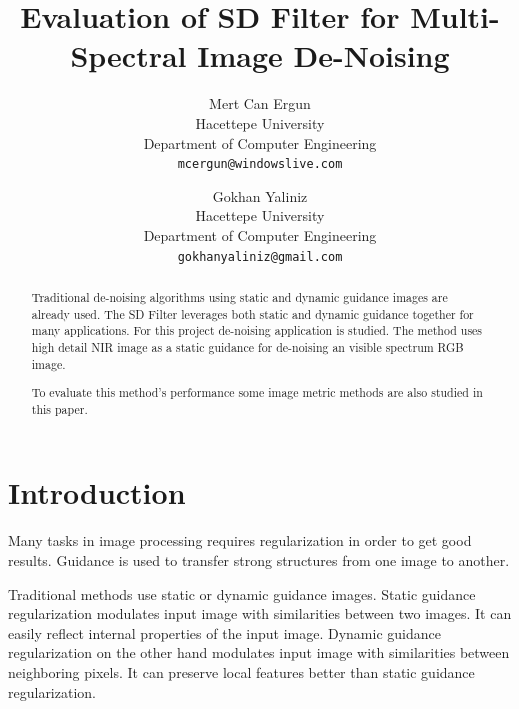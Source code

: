 \documentclass[10pt,twocolumn,letterpaper]{article}
\begin{document}
\title{Evaluation of SD Filter for Multi-Spectral Image De-Noising}

\author{Mert Can Ergun\\
Hacettepe University\\
Department of Computer Engineering\\
{\tt\small mcergun@windowslive.com}
\and
Gokhan Yaliniz\\
Hacettepe University\\
Department of Computer Engineering\\
{\tt\small gokhanyaliniz@gmail.com}
}

\maketitle

\begin{abstract}
   Traditional de-noising algorithms using static and dynamic guidance images are already used. The SD Filter leverages both static and dynamic guidance together for many applications. For this project de-noising application is studied. The method uses high detail NIR image as a static guidance for de-noising an visible spectrum RGB image.
   
   To evaluate this method's performance some image metric methods are also studied in this paper.
\end{abstract}

\section{Introduction}

Many tasks in image processing requires regularization in order to get good results. Guidance is used to transfer strong structures from one image to another. 

Traditional methods use static or dynamic guidance images. Static guidance regularization modulates input image with similarities between two images. It can easily reflect internal properties of the input image.
Dynamic guidance regularization on the other hand modulates input image with similarities between neighboring pixels. It can preserve local features better than static guidance regularization.
\end{document}
